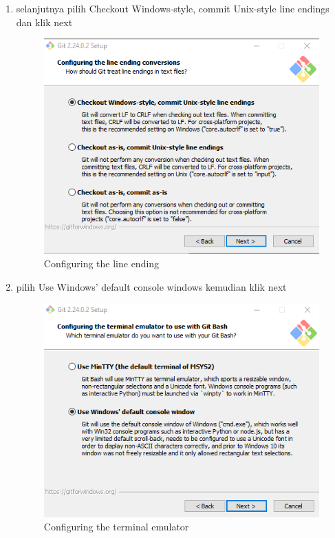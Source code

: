 \begin{enumerate}
\item selanjutnya pilih Checkout Windows-style, commit Unix-style line endings dan klik next
\begin{figure}[H]
\centering
\includegraphics[scale=.5]{figures/install_git8}
\caption{Configuring the line ending}
\label{install_git8}
\end{figure}

\item pilih Use Windows’ default console windows kemudian klik next
\begin{figure}[H]
\centering
\includegraphics[scale=.5]{figures/install_git9}
\caption{Configuring the terminal emulator}
\label{install_git9}
\end{figure}


\end{enumerate}
